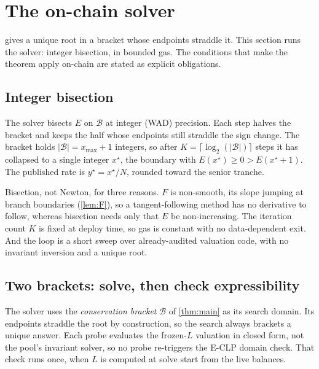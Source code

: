 \section{The on-chain solver}
\label{sec:solver}

 gives a unique root in a bracket whose endpoints straddle
it. This section runs the solver: integer bisection, in bounded gas. The
conditions that make the theorem apply on-chain are stated as explicit
obligations.

\subsection{Integer bisection}
\label{sec:solver:bisection}

The solver bisects $E$ on $\mathcal{B}$ at integer (WAD) precision. Each
step halves the bracket and keeps the half whose endpoints still straddle
the sign change. The bracket holds $\lvert\mathcal{B}\rvert = x_{\max}+1$
integers, so after $K = \lceil \log_2(\lvert\mathcal{B}\rvert) \rceil$
steps it has collapsed to a single integer $x^\star$, the boundary with
$E(x^\star) \geq 0 > E(x^\star + 1)$. The published rate is
$y^\star = x^\star / N$, rounded toward the senior tranche.

Bisection, not Newton, for three reasons. $F$ is non-smooth, its slope
jumping at branch boundaries (\cref{lem:F}), so a tangent-following
method has no derivative to follow, whereas bisection needs only that
$E$ be non-increasing. The iteration count $K$ is fixed at deploy time,
so gas is constant with no data-dependent exit. And the loop is a short
sweep over already-audited valuation code, with no invariant inversion
and a unique root.

\subsection{Two brackets: solve, then check expressibility}
\label{sec:solver:bracket}

The solver uses the \emph{conservation bracket} $\mathcal{B}$ of
\cref{thm:main} as its search domain. Its endpoints straddle the root by
construction, so the search always brackets a unique answer. Each probe
evaluates the frozen-$L$ valuation in closed form, not the pool's
invariant solver, so no probe re-triggers the E-CLP domain check. That
check runs once, when $L$ is computed at solve start from the live
balances.

